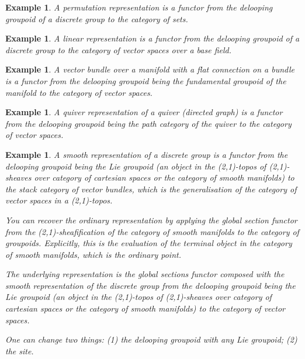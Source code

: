 \documentclass{tufte-book}
\newtheorem{example}[theorem]{Example}
\begin{document}
\begin{example}
	A permutation representation is a functor from the delooping groupoid of a discrete group to the category of sets.
\end{example}

\begin{example}
	A linear representation is a functor from the delooping groupoid of a discrete group to the category of vector spaces over a base field.
\end{example}

\begin{example}
	A vector bundle over a manifold with a flat connection on a bundle is a functor from the delooping groupoid being the fundamental groupoid of the manifold to the category of vector spaces.
\end{example}

\begin{example}
	A quiver representation of a quiver (directed graph) is a functor from the delooping groupoid being the path category of the quiver to the category of vector spaces.
\end{example}

\begin{example}
	A smooth representation of a discrete group is a functor from the delooping groupoid being the Lie groupoid (an object in the (2,1)-topos of (2,1)-sheaves over category of cartesian spaces or the category of smooth manifolds) to the stack category of vector bundles, which is the generalisation of the category of vector spaces in a (2,1)-topos.

	You can recover the ordinary representation by applying the global section functor from the (2,1)-sheafification of the category of smooth manifolds to the category of groupoids. Explicitly, this is the evaluation of the terminal object in the category of smooth manifolds, which is the ordinary point.

	The underlying representation is the global sections functor composed with the smooth representation of the discrete group from the delooping groupoid being the Lie groupoid (an object in the (2,1)-topos of (2,1)-sheaves over category of cartesian spaces or the category of smooth manifolds) to the category of vector spaces.

	One can change two things: (1) the delooping groupoid with any Lie groupoid; (2) the site.
\end{example}
\end{document}
